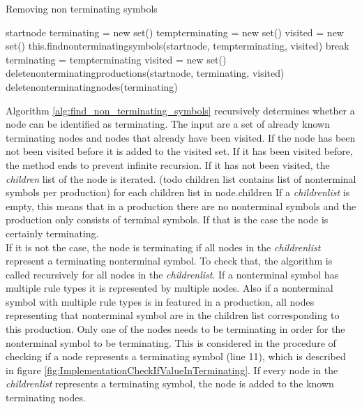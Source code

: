 \begin{algorithm}[H]
\caption{Removing non terminating symbols}
\begin{algorithmic}[1] 
\Require start\textunderscore node
\State terminating = new set()
\State temp\textunderscore terminating = new set()
	\State visited = new set()
	\State this.find\textunderscore non\textunderscore terminating\textunderscore symbols(start\textunderscore node, temp\textunderscore terminating, visited)
		\State break
	\Else
		\State terminating = temp\textunderscore terminating
	\EndIf
\EndWhile
\State visited = new set() 
\State delete\textunderscore non\textunderscore terminating\textunderscore productions(start\textunderscore node, terminating, visited)
\State delete\textunderscore non\textunderscore terminating\textunderscore nodes(terminating)
\end{algorithmic}
\label{alg:remove_non_terminating_symbols}
\end{algorithm}

Algorithm \ref{alg:find_non_terminating_symbols}  recursively determines whether a node can be identified as terminating.
The input are a set of already known terminating nodes and nodes that already have been visited.
If the node has been not been visited before it is added to the visited set.
If it has been visited before, the method ends to prevent infinite recursion.
If it has not been visited, the \textit{children} list of the node is iterated. (todo children list contains list of nonterminal symbols per production)
for each children list in node.children
If a \textit{children\textunderscore list} is empty, this means that in a production there are no nonterminal symbols and the production only consists of terminal symbols. If that is the case the node is certainly terminating.\\
If it is not the case, the node is terminating if all nodes in the \textit{children\textunderscore list} represent a terminating nonterminal symbol.
To check that, the algorithm is called recursively for all nodes in the \textit{children\textunderscore list}.
If a nonterminal symbol has multiple rule types it is represented by multiple nodes. Also if a nonterminal symbol with multiple rule types is in featured in a production, all nodes representing that nonterminal symbol are in the children list corresponding to this production. Only one of the nodes needs to be terminating in order for the nonterminal symbol to be terminating.
This is considered in the procedure of checking if a node represents a terminating symbol (line 11), which is described in figure \ref{fig:ImplementationCheckIfValueInTerminating}.
If every node in the \textit{children\textunderscore list} represents a terminating symbol, the node is added to the known terminating nodes.

